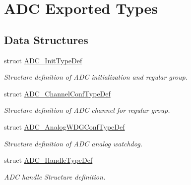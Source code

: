 \hypertarget{group___a_d_c___exported___types}{}\section{A\+DC Exported Types}
\label{group___a_d_c___exported___types}
\subsection*{Data Structures}
\begin{DoxyCompactItemize}
\item 
struct \hyperlink{struct_a_d_c___init_type_def}{A\+D\+C\+\_\+\+Init\+Type\+Def}
\begin{DoxyCompactList}\small\item\em Structure definition of A\+DC initialization and regular group. \end{DoxyCompactList}\item 
struct \hyperlink{struct_a_d_c___channel_conf_type_def}{A\+D\+C\+\_\+\+Channel\+Conf\+Type\+Def}
\begin{DoxyCompactList}\small\item\em Structure definition of A\+DC channel for regular group. \end{DoxyCompactList}\item 
struct \hyperlink{struct_a_d_c___analog_w_d_g_conf_type_def}{A\+D\+C\+\_\+\+Analog\+W\+D\+G\+Conf\+Type\+Def}
\begin{DoxyCompactList}\small\item\em Structure definition of A\+DC analog watchdog. \end{DoxyCompactList}\item 
struct \hyperlink{struct_a_d_c___handle_type_def}{A\+D\+C\+\_\+\+Handle\+Type\+Def}
\begin{DoxyCompactList}\small\item\em A\+DC handle Structure definition. \end{DoxyCompactList}\end{DoxyCompactItemize}
